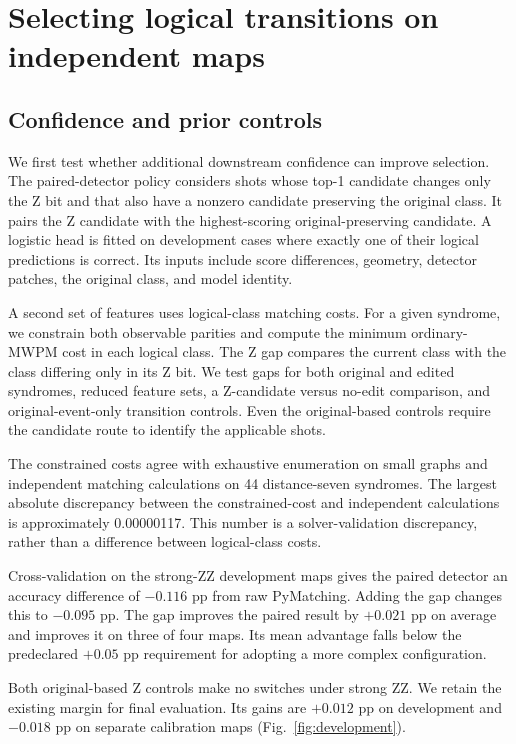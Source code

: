 \documentclass[aps,prd,12pt,twocolumn,superscriptaddress,floatfix]{revtex4-2}
\begin{document}
\section{Selecting logical transitions on independent maps}
\label{sec:selection}

\subsection{Confidence and prior controls}

We first test whether additional downstream confidence can improve selection. The paired-detector policy considers shots whose top-1 candidate changes only the Z bit and that also have a nonzero candidate preserving the original class. It pairs the Z candidate with the highest-scoring original-preserving candidate. A logistic head is fitted on development cases where exactly one of their logical predictions is correct. Its inputs include score differences, geometry, detector patches, the original class, and model identity.

A second set of features uses logical-class matching costs. For a given syndrome, we constrain both observable parities and compute the minimum ordinary-MWPM cost in each logical class. The Z gap compares the current class with the class differing only in its Z bit. We test gaps for both original and edited syndromes, reduced feature sets, a Z-candidate versus no-edit comparison, and original-event-only transition controls. Even the original-based controls require the candidate route to identify the applicable shots.

The constrained costs agree with exhaustive enumeration on small graphs and independent matching calculations on 44 distance-seven syndromes. The largest absolute discrepancy between the constrained-cost and independent calculations is approximately 0.00000117. This number is a solver-validation discrepancy, rather than a difference between logical-class costs.

Cross-validation on the strong-ZZ development maps gives the paired detector an accuracy difference of \(-0.116\) pp from raw PyMatching. Adding the gap changes this to \(-0.095\) pp. The gap improves the paired result by \(+0.021\) pp on average and improves it on three of four maps. Its mean advantage falls below the predeclared \(+0.05\) pp requirement for adopting a more complex configuration.

Both original-based Z controls make no switches under strong ZZ. We retain the existing margin for final evaluation. Its gains are \(+0.012\) pp on development and \(-0.018\) pp on separate calibration maps (Fig.~\ref{fig:development}).
\end{document}
